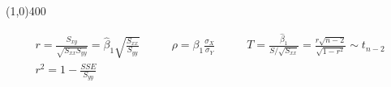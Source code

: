 \documentclass[11pt]{article}
\newcommand{\bo}{\hat \beta_1}
\begin{document}
\begin{center}
\line(1,0){400}
\end{center}
\begin{align*}
r = \frac{S_{xy}}{\sqrt{S_{xx}S_{yy}}} = \bo\sqrt{\frac{S_{xx}}{S_{yy}}}
\quad \quad &
\rho = \beta_1\frac{\sigma_X}{\sigma_Y}
\quad \quad &
T = \frac{\bo}{S/\sqrt{S_{xx}}} = \frac{r\sqrt{n - 2}}{\sqrt{1 - r^2}}
\sim t_{n - 2}  \\
r^2 = 1 - \frac{SSE}{S_{yy}}
\end{align*}
\end{document}
